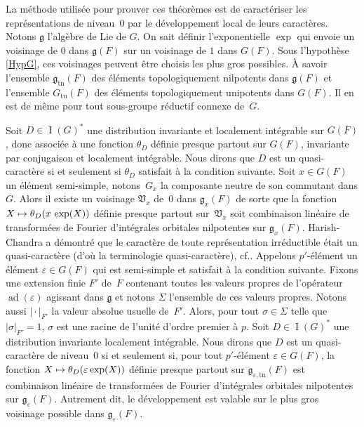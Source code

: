 \documentclass[11pt]{article}
\newcommand{\cf}{cf.\xspace}
\numberwithin{equation}{section}\providecommand{\og}{«\,}\providecommand{\fg}{\,»}
\let\epsilon\varepsilon
\newcommand\mto{\mathchoice{\longmapsto}{\mapsto}{\mapsto}{\mapsto}}
\newcommand{\frg}{\mathfrak{g}}
\newcommand{\frV}{\mathfrak{V}}
\newcommand{\tn}{\mathrm{tn}}
\newcommand{\tu}{\mathrm{tu}}
\DeclareMathOperator{\ad}{ad}
\DeclareMathOperator{\rI}{I}
\theoremstyle{plain}
\theoremstyle{definition}
\begin{document}
La méthode utilisée pour prouver ces théorèmes est de caractériser les représentations de niveau~$0$ par le développement local de leurs caractères. Notons $\frg$ l'algèbre de Lie de $G$. On sait définir l'exponentielle $\exp$ qui envoie un voisinage de $0$ dans $\frg(F)$ sur un voisinage de $1$ dans $G(F)$. Sous l'hypothèse \ref{HypG}, ces voisinages peuvent être choisis les plus gros possibles. À savoir l'ensemble $\frg_{\tn}(F)$ des éléments topologiquement nilpotents dans $\frg(F)$ et l'ensemble $G_{\tu}(F)$ des éléments topologiquement unipotents dans $G(F)$. Il en est de même pour tout sous-groupe réductif connexe de~$G$.

Soit $D\in \rI(G)^*$ une distribution invariante et localement intégrable sur
$G(F)$, donc associée à une fonction $\theta_{D}$ définie presque partout sur $G(F)$, invariante par conjugaison et localement intégrable. Nous dirons que $D$ est un quasi-caractère si et seulement si $\theta_{D}$ satisfait à la condition suivante. Soit $x\in G(F)$ un élément semi-simple, notons~$G_{x}$ la composante neutre de son commutant dans $G$. Alors il existe un voisinage $\frV_{x}$ de~$0$ dans $\frg_{x}(F)$ de sorte que la fonction $X\mto \theta_{D}(x\, \exp(X))$ définie presque partout sur~$\frV_{x}$ soit combinaison linéaire de transformées de Fourier d'intégrales orbitales nilpotentes sur $\frg_{x}(F)$. Harish-Chandra a démontré que le caractère de toute représentation irréductible était un quasi-caractère (d'où la terminologie \og quasi-caractère\fg), \cf \cite[Th.\,16.2]{HC}. Appelons $p'$-élément un élément $\epsilon\in G(F)$ qui est semi-simple et satisfait à la condition suivante. Fixons une extension finie $F'$ de~$F$ contenant toutes les valeurs propres de l'opérateur $\ad(\epsilon)$ agissant dans $\frg$ et notons $\Sigma$ l'ensemble de ces valeurs propres. Notons aussi $\vert {\cdot}\vert _{F'}$ la valeur absolue usuelle de~$F'$. Alors, pour tout $\sigma\in \Sigma$ telle que $\vert \sigma\vert _{F'}=1$, $\sigma$ est une racine de l'unité d'ordre premier à $p$. Soit $D\in \rI(G)^*$ une distribution invariante localement intégrable. Nous dirons que $D$ est un quasi-caractère de niveau~$0$ si et seulement si, pour tout $p'$-élément $\epsilon\in G(F)$, la fonction $X\mto \theta_{D}(\epsilon \exp(X))$ définie presque partout sur $\frg_{\epsilon,\tn}(F)$ est combinaison linéaire de transformées de Fourier d'intégrales orbitales nilpotentes sur $\frg_{\epsilon}(F)$. Autrement dit, le développement est valable sur le plus gros voisinage possible dans $\frg_{\epsilon}(F)$.\enlargethispage{\baselineskip}%
\end{document}
